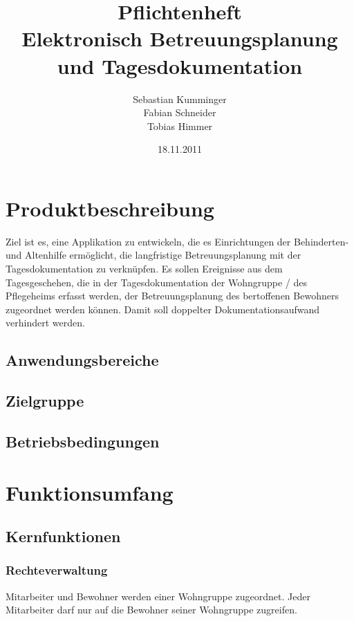 \documentclass[a4paper,10pt]{article}
\author{Sebastian Kumminger\\
	Fabian Schneider\\
	Tobias Himmer}
\title{Pflichtenheft\\
	Elektronisch Betreuungsplanung und Tagesdokumentation}
\date{18.11.2011}
\begin{document}
\maketitle

\tableofcontents
\newpage
\section{Produktbeschreibung}
Ziel ist es, eine Applikation zu entwickeln, die es Einrichtungen der Behinderten- und Altenhilfe ermöglicht, die langfristige Betreuungsplanung mit der Tagesdokumentation zu verknüpfen. Es sollen Ereignisse aus dem Tagesgeschehen, die in der Tagesdokumentation der Wohngruppe / des Pflegeheims erfasst werden, der Betreuungsplanung des bertoffenen Bewohners zugeordnet werden können. Damit soll doppelter Dokumentationsaufwand verhindert werden.
\subsection{Anwendungsbereiche}
\subsection{Zielgruppe}
\subsection{Betriebsbedingungen}

\section{Funktionsumfang}
\subsection{Kernfunktionen}
\subsubsection{Rechteverwaltung}
Mitarbeiter und Bewohner werden einer Wohngruppe zugeordnet. Jeder Mitarbeiter darf nur auf die Bewohner seiner Wohngruppe zugreifen.
\end{document}
